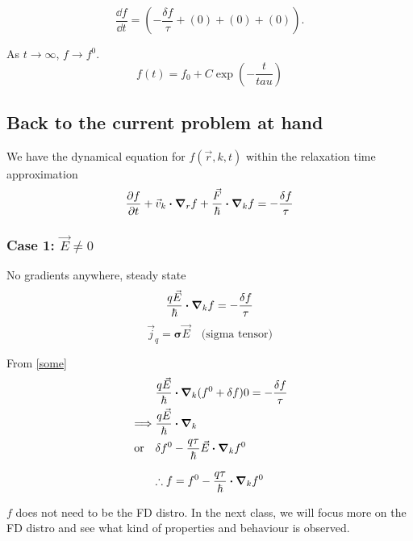 \documentclass[a4paper]{article}
\begin{document}
\begin{equation}
	\frac{\dd f}{\dd t} = \left( -\frac{\delta f}{\tau} + (0) + (0) + (0) \right).
\end{equation}

As $t\to \infty$, $f\to f^{0}$.
\begin{equation}
	f(t) = f_0 + C\exp(-\frac{t}{tau})
\end{equation}

\subsection*{Back to the current problem at hand}
We have the dynamical equation for $f(\vec{r}, k, t)$ within the 
relaxation time approximation
\begin{equation}
	\pdv{f}{t} + \vec{v}_k\vdot\grad_r f + \frac{\vec{F}}{\hbar}\vdot\grad_kf = -\frac{\delta f}{\tau}
\end{equation}
\subsubsection*{Case 1: $\vec{E} \neq 0$}
No gradients anywhere, steady state
\begin{equation}
	\label{some}
	\frac{q\vec{E}}{\hbar}\vdot\grad_kf = -\frac{\delta f}{\tau}
\end{equation}
\begin{equation}
	\vec{j}_q = \mathbf{\sigma}\vec{E} \quad \text{(sigma tensor)}
\end{equation}

From \ref{some}
\begin{equation}
	\begin{split}
		&\frac{q\vec{E}}{\hbar}\vdot\grad_k(f^{0}+ \delta f)0 = -\frac{\delta f}{\tau} \\  %
		\implies & \frac{q\vec{E}}{\hbar}\vdot\grad_k \\
		\text{or} \quad & \delta f^{0} - \frac{q\tau}{\hbar}\vec{E}\vdot\grad_k f^{0}
	\end{split}
\end{equation}

\begin{equation}
	\therefore f = f^{0} - \frac{q\tau}{\hbar}\vdot\grad_kf^{0}
\end{equation}

$f$ does not need to be the FD distro. In the next class, we will focus
more on the FD distro and see what kind of properties and behaviour
is observed.
\end{document}
